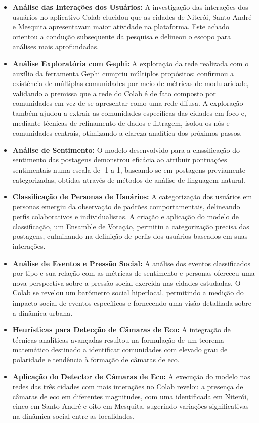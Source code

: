 \begin{itemize}
	\item \textbf{Análise das Interações dos Usuários:}
	      A investigação das interações dos usuários no aplicativo Colab elucidou que as cidades de Niterói, Santo André e Mesquita apresentavam maior atividade na plataforma. Este achado orientou a condução subsequente da pesquisa e delineou o escopo para análises mais aprofundadas.

	\item \textbf{Análise Exploratória com Gephi:}
	      A exploração da rede realizada com o auxílio da ferramenta Gephi cumpriu múltiplos propósitos: confirmou a existência de múltiplas comunidades por meio de métricas de modularidade, validando a premissa que a rede do Colab é de fato composto por comunidades em vez de se apresentar como uma rede difusa. A exploração também ajudou a extrair as comunidades específicas das cidades em foco e, mediante técnicas de refinamento de dados e filtragem, isolou os nós e comunidades centrais, otimizando a clareza analítica dos próximos passos.

	\item \textbf{Análise de Sentimento:}
	      O modelo desenvolvido para a classificação do sentimento das postagens demonstrou eficácia ao atribuir pontuações sentimentais numa escala de -1 a 1, baseando-se em postagens previamente categorizadas, obtidas através de métodos de análise de linguagem natural.

	\item \textbf{Classificação de Personas de Usuários:}
	      A categorização dos usuários em personas emergiu da observação de padrões comportamentais, delineando perfis colaborativos e individualistas. A criação e aplicação do modelo de classificação, um Ensamble de Votação, permitiu a categorização precisa das postagens, culminando na definição de perfis dos usuários baseados em suas interações.

	\item \textbf{Análise de Eventos e Pressão Social:}
	      A análise dos eventos classificados por tipo e sua relação com as métricas de sentimento e personas ofereceu uma nova perspectiva sobre a pressão social exercida nas cidades estudadas. O Colab se revelou um barômetro social hiperlocal, permitindo a medição do impacto social de eventos específicos e fornecendo uma visão detalhada sobre a dinâmica urbana.

	\item \textbf{Heurísticas para Detecção de Câmaras de Eco:}
	      A integração de técnicas analíticas avançadas resultou na formulação de um teorema matemático destinado a identificar comunidades com elevado grau de polaridade e tendência à formação de câmaras de eco.

	\item \textbf{Aplicação do Detector de Câmaras de Eco:}
	      A execução do modelo nas redes das três cidades com mais interações no Colab revelou a presença de câmaras de eco em diferentes magnitudes, com uma identificada em Niterói, cinco em Santo André e oito em Mesquita, sugerindo variações significativas na dinâmica social entre as localidades.

\end{itemize}

